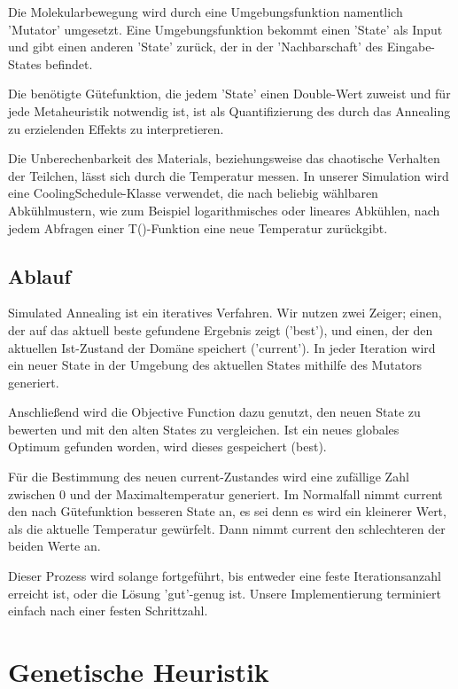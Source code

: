 \documentclass[runningheads,a4paper]{llncs}
\begin{document}
Die Molekularbewegung wird durch eine Umgebungsfunktion namentlich 'Mutator' umgesetzt. Eine Umgebungsfunktion bekommt einen 'State' als Input und gibt einen anderen 'State' zurück, der in der 'Nachbarschaft' des Eingabe-States befindet.

Die benötigte Gütefunktion, die jedem 'State' einen Double-Wert zuweist und für jede Metaheuristik notwendig ist, ist als Quantifizierung des durch das Annealing zu erzielenden Effekts zu interpretieren.

Die Unberechenbarkeit des Materials, beziehungsweise das chaotische Verhalten der Teilchen, lässt sich durch die Temperatur messen. In unserer Simulation wird eine CoolingSchedule-Klasse verwendet, die nach beliebig wählbaren Abkühlmustern, wie zum Beispiel logarithmisches oder lineares Abkühlen, nach jedem Abfragen einer T()-Funktion eine neue Temperatur zurückgibt.

\subsection{Ablauf}

Simulated Annealing ist ein iteratives Verfahren. Wir nutzen zwei Zeiger; einen, der auf das aktuell beste gefundene Ergebnis zeigt ('best'), und einen, der den aktuellen Ist-Zustand der Domäne speichert ('current'). In jeder Iteration wird ein neuer State in der Umgebung des aktuellen States mithilfe des Mutators generiert.

Anschließend wird die Objective Function dazu genutzt, den neuen State zu bewerten und mit den alten States zu vergleichen. Ist ein neues globales Optimum gefunden worden, wird dieses gespeichert (best).

Für die Bestimmung des neuen current-Zustandes wird eine zufällige Zahl zwischen 0 und der Maximaltemperatur generiert. Im Normalfall nimmt current den nach Gütefunktion besseren State an, es sei denn es wird ein kleinerer Wert, als die aktuelle Temperatur gewürfelt. Dann nimmt current den schlechteren der beiden Werte an.

Dieser Prozess wird solange fortgeführt, bis entweder eine feste Iterationsanzahl erreicht ist, oder die Lösung 'gut'-genug ist. Unsere Implementierung terminiert einfach nach einer festen Schrittzahl.

\section{Genetische Heuristik}
\end{document}
